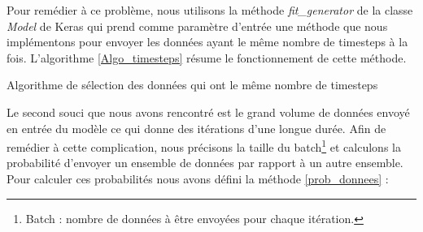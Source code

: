 Pour remédier à ce problème, nous utilisons la méthode \textit{fit\_generator} de la classe \textit{Model} de Keras qui prend comme paramètre d'entrée une méthode que nous implémentons pour envoyer les données ayant le même nombre de timesteps à la fois. L'algorithme \ref{Algo_timesteps} résume le fonctionnement de cette méthode. 

\begin{algorithm2e}[H]
\caption{Algorithme de sélection des données qui ont le même nombre de timesteps \label{Algo_timesteps}}
\SetAlgoLined
{}
\end{algorithm2e}

Le second souci que nous avons rencontré est le grand volume de données envoyé en entrée du modèle ce qui donne des itérations d'une longue durée. Afin de remédier à cette complication, nous précisons la taille du batch\footnote{Batch : nombre de données à être envoyées pour chaque itération.} et calculons la probabilité d'envoyer un ensemble de données par rapport à un autre ensemble. Pour calculer ces probabilités nous avons défini la méthode \ref{prob_donnees} :

